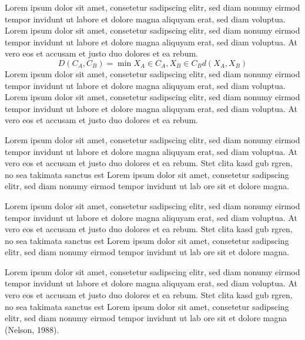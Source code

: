 Lorem ipsum dolor sit amet, consetetur sadipscing elitr, sed diam nonumy eirmod tempor invidunt ut labore et dolore magna aliquyam erat, sed diam voluptua. Lorem ipsum dolor sit amet, consetetur sadipscing elitr, sed diam nonumy eirmod tempor invidunt ut labore et dolore magna aliquyam erat, sed diam voluptua. At vero eos et accusam et justo duo dolores et ea rebum. 
\begin{equation}
D\left(C_{A},C_{B}\right) = \min X_{A}\in C_{A},X_{B}\in C_{B} 
d\left(X_{A},X_{B}\right)
\label{Eq3.2}
\end{equation}
Lorem ipsum dolor sit amet, consetetur sadipscing elitr, sed diam nonumy eirmod tempor invidunt ut labore et dolore magna aliquyam erat, sed diam voluptua. Lorem ipsum dolor sit amet, consetetur sadipscing elitr, sed diam nonumy eirmod tempor invidunt ut labore et dolore magna aliquyam erat, sed diam voluptua. At vero eos et accusam et justo duo dolores et ea rebum. 


Lorem ipsum dolor sit amet, consetetur sadipscing elitr, sed diam nonumy eirmod tempor invidunt ut labore et dolore magna aliquyam erat, sed diam voluptua. At vero eos et accusam et justo duo dolores et ea rebum. Stet clita kasd gub rgren, no sea takimata sanctus est Lorem ipsum dolor sit amet, consetetur sadipscing elitr, sed diam nonumy eirmod tempor invidunt ut lab ore sit et dolore magna.

Lorem ipsum dolor sit amet, consetetur sadipscing elitr, sed diam nonumy eirmod tempor invidunt ut labore et dolore magna aliquyam erat, sed diam voluptua. At vero eos et accusam et justo duo dolores et ea rebum. Stet clita kasd gub rgren, no sea takimata sanctus est Lorem ipsum dolor sit amet, consetetur sadipscing elitr, sed diam nonumy eirmod tempor invidunt ut lab ore sit et dolore magna.


Lorem ipsum dolor sit amet, consetetur sadipscing elitr, sed diam nonumy eirmod tempor invidunt ut labore et dolore magna aliquyam erat, sed diam voluptua. At vero eos et accusam et justo duo dolores et ea rebum. Stet clita kasd gub rgren, no sea takimata sanctus est Lorem ipsum dolor sit amet, consetetur sadipscing elitr, sed diam nonumy eirmod tempor invidunt ut lab ore sit et dolore magna (Nelson, 1988).

